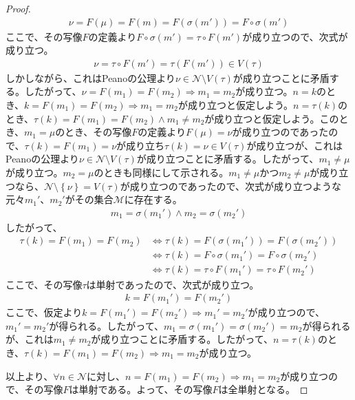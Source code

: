 \documentclass[dvipdfmx]{jsarticle}
\begin{document}
\begin{proof}
\begin{align*}
\nu = F(\mu) = F(m) = F\left( \sigma\left( m' \right) \right) = F \circ \sigma\left( m' \right)
\end{align*}
ここで、その写像$F$の定義より$F \circ \sigma\left( m' \right) = \tau \circ F\left( m' \right)$が成り立つので、次式が成り立つ。
\begin{align*}
\nu = \tau \circ F\left( m' \right) = \tau\left( F\left( m' \right) \right) \in V(\tau)
\end{align*}
しかしながら、これはPeanoの公理より$\nu \in \mathcal{N \setminus}V(\tau)$が成り立つことに矛盾する。したがって、$\nu = F\left( m_{1} \right) = F\left( m_{2} \right) \Rightarrow m_{1} = m_{2}$が成り立つ。$n = k$のとき、$k = F\left( m_{1} \right) = F\left( m_{2} \right) \Rightarrow m_{1} = m_{2}$が成り立つと仮定しよう。$n = \tau(k)$のとき、$\tau(k) = F\left( m_{1} \right) = F\left( m_{2} \right) \land m_{1} \neq m_{2}$が成り立つと仮定しよう。このとき、$m_{1} = \mu$のとき、その写像$F$の定義より$F(\mu) = \nu$が成り立つのであったので、$\tau(k) = F\left( m_{1} \right) = \nu$が成り立ち$\tau(k) = \nu \in V(\tau)$が成り立つが、これはPeanoの公理より$\nu \in \mathcal{N \setminus}V(\tau)$が成り立つことに矛盾する。したがって、$m_{1} \neq \mu$が成り立つ。$m_{2} = \mu$のときも同様にして示される。$m_{1} \neq \mu$かつ$m_{2} \neq \mu$が成り立つなら、$\mathcal{N \setminus}\left\{ \nu \right\} = V(\tau)$が成り立つのであったので、次式が成り立つような元々$m_{1}'$、$m_{2}'$がその集合$\mathcal{M}$に存在する。
\begin{align*}
m_{1} = \sigma\left( m_{1}' \right) \land m_{2} = \sigma\left( m_{2}' \right)
\end{align*}
したがって、
\begin{align*}
\tau(k) = F\left( m_{1} \right) = F\left( m_{2} \right) &\Leftrightarrow \tau(k) = F\left( \sigma\left( m_{1}' \right) \right) = F\left( \sigma\left( m_{2}' \right) \right)\\
&\Leftrightarrow \tau(k) = F \circ \sigma\left( m_{1}' \right) = F \circ \sigma\left( m_{2}' \right)\\
&\Leftrightarrow \tau(k) = \tau \circ F\left( m_{1}' \right) = \tau \circ F\left( m_{2}' \right)
\end{align*}
ここで、その写像$\tau$は単射であったので、次式が成り立つ。
\begin{align*}
k = F\left( m_{1}' \right) = F\left( m_{2}' \right)
\end{align*}
ここで、仮定より$k = F\left( m_{1}' \right) = F\left( m_{2}' \right) \Rightarrow m_{1}' = m_{2}'$が成り立つので、$m_{1}' = m_{2}'$が得られる。したがって、$m_{1} = \sigma\left( m_{1}' \right) = \sigma\left( m_{2}' \right) = m_{2}$が得られるが、これは$m_{1} \neq m_{2}$が成り立つことに矛盾する。したがって、$n = \tau(k)$のとき、$\tau(k) = F\left( m_{1} \right) = F\left( m_{2} \right) \Rightarrow m_{1} = m_{2}$が成り立つ。\par
以上より、$\forall n \in \mathcal{N}$に対し、$n = F\left( m_{1} \right) = F\left( m_{2} \right) \Rightarrow m_{1} = m_{2}$が成り立つので、その写像$F$は単射である。よって、その写像$F$は全単射となる。
\end{proof}
\end{document}
